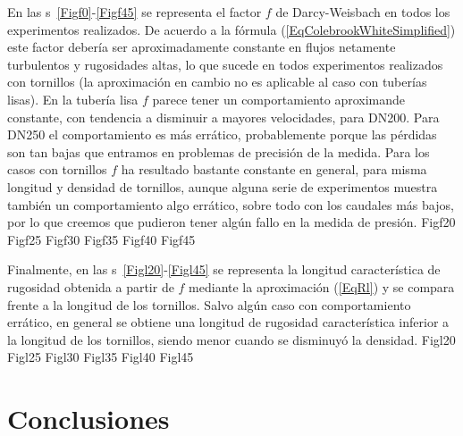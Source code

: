 \documentclass[a4paper]{article}
\begin{document}
En las \figurename{s}~\ref{Figf0}-\ref{Figf45} se representa el factor $f$ de
Darcy-Weisbach en todos los experimentos realizados. De acuerdo a la fórmula
(\ref{EqColebrookWhiteSimplified}) este factor debería ser aproximadamente
constante en flujos netamente turbulentos y rugosidades altas, lo que sucede en
todos experimentos realizados con tornillos (la aproximación en cambio no es
aplicable al caso con tuberías lisas). En la tubería lisa $f$ parece tener un
comportamiento aproximande constante, con tendencia a disminuir a mayores velocidades, para DN200. Para DN250 el comportamiento es más errático, probablemente
porque las pérdidas son tan bajas que entramos en problemas de precisión de la
medida. Para los casos con tornillos $f$ ha resultado bastante constante en
general, para misma longitud y densidad de tornillos, aunque alguna serie de
experimentos muestra también un comportamiento algo errático, sobre todo con los
caudales más bajos, por lo que creemos que pudieron tener algún fallo en la
medida de presión.
{Figf20}
{Figf25}
{Figf30}
{Figf35}
{Figf40}
{Figf45}

Finalmente, en las \figurename{s}~\ref{Figl20}-\ref{Figl45} se representa la
longitud característica de rugosidad obtenida a partir de $f$ mediante la
aproximación (\ref{EqRl}) y se compara frente a la longitud de los tornillos.
Salvo algún caso con comportamiento errático, en general se obtiene una
longitud de rugosidad característica inferior a la longitud de los tornillos,
siendo menor cuando se disminuyó la densidad.
{Figl20}
{Figl25}
{Figl30}
{Figl35}
{Figl40}
{Figl45}

\section{Conclusiones}
\end{document}
